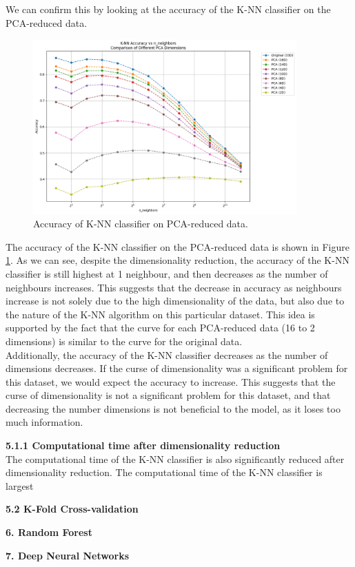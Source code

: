 \documentclass[12pt]{article}
\begin{document}
We can confirm this by looking at the accuracy of the K-NN classifier on the PCA-reduced data. 

\begin{figure}[h!]
\centering
\includegraphics[width=0.9\textwidth]{figures/knn_accuracy_pca.png}
\caption{Accuracy of K-NN classifier on PCA-reduced data.}
\label{fig:knn_accuracy_pca}
\end{figure}


The accuracy of the K-NN classifier on the PCA-reduced data is shown in Figure \ref{fig:knn_accuracy_pca}. As we can see, despite the dimensionality reduction, the accuracy of the K-NN classifier is still highest at 1 neighbour, and then decreases as the number of neighbours increases. This suggests that the decrease in accuracy as neighbours increase is not solely due to the high dimensionality of the data, but also due to the nature of the K-NN algorithm on this particular dataset. This idea is supported by the fact that the curve for each PCA-reduced data (16 to 2 dimensions) is similar to the curve for the original data. 
\\
Additionally, the accuracy of the K-NN classifier decreases as the number of dimensions decreases. If the curse of dimensionality was a significant problem for this dataset, we would expect the accuracy to increase. This suggests that the curse of dimensionality is not a significant problem for this dataset, and that decreasing the number dimensions is not beneficial to the model, as it loses too much information.

\textbf{5.1.1 Computational time after dimensionality reduction}
\\
The computational time of the K-NN classifier is also significantly reduced after dimensionality reduction. The computational time of the K-NN classifier is largest

\vspace{20pt}

\textbf{5.2 K-Fold Cross-validation}

\textbf{6. Random Forest}

\textbf{7. Deep Neural Networks}
\end{document}
